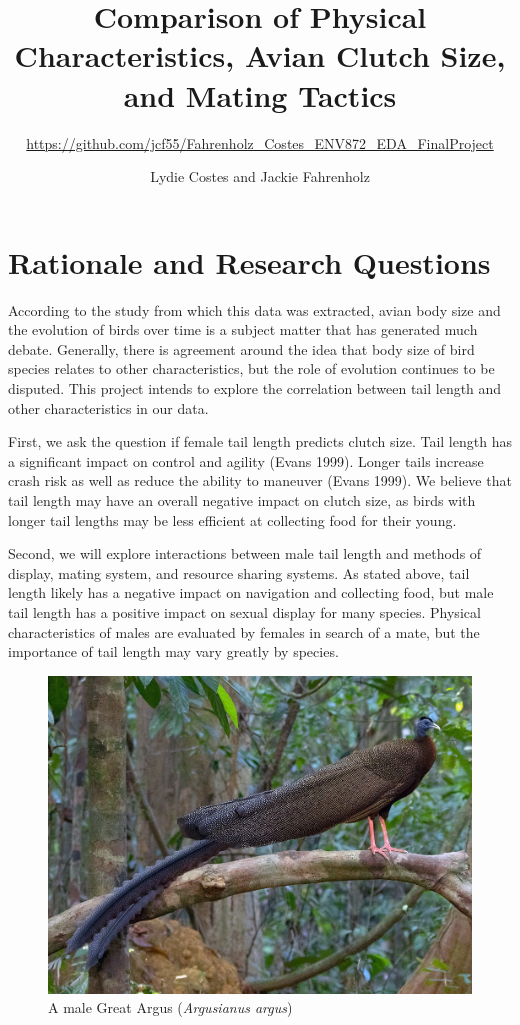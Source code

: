 \documentclass[
  12pt,
]{article}
\title{Comparison of Physical Characteristics, Avian Clutch Size, and
Mating Tactics}
\subtitle{\url{https://github.com/jcf55/Fahrenholz_Costes_ENV872_EDA_FinalProject}}
\author{Lydie Costes and Jackie Fahrenholz}
\date{}
\begin{document}
\maketitle

\newpage
\tableofcontents 
\newpage
\listoftables 
\listoffigures 
\newpage

\hypertarget{rationale-and-research-questions}{%
\section{Rationale and Research
Questions}\label{rationale-and-research-questions}}

According to the study from which this data was extracted, avian body
size and the evolution of birds over time is a subject matter that has
generated much debate. Generally, there is agreement around the idea
that body size of bird species relates to other characteristics, but the
role of evolution continues to be disputed. This project intends to
explore the correlation between tail length and other characteristics in
our data.

First, we ask the question if female tail length predicts clutch size.
Tail length has a significant impact on control and agility (Evans
1999). Longer tails increase crash risk as well as reduce the ability to
maneuver (Evans 1999). We believe that tail length may have an overall
negative impact on clutch size, as birds with longer tail lengths may be
less efficient at collecting food for their young.

Second, we will explore interactions between male tail length and
methods of display, mating system, and resource sharing systems. As
stated above, tail length likely has a negative impact on navigation and
collecting food, but male tail length has a positive impact on sexual
display for many species. Physical characteristics of males are
evaluated by females in search of a mate, but the importance of tail
length may vary greatly by species.

\begin{figure}
\centering
\includegraphics{Images/crested_argus_pheasant.jpeg}
\caption{A male Great Argus (\emph{Argusianus argus})}
\end{figure}
\end{document}
